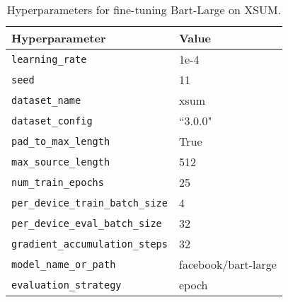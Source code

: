 \begin{table}[ht!]
\centering
\begin{tabular}{ll}
\toprule
\textbf{Hyperparameter} & \textbf{Value} \\
\midrule
\texttt{learning\_rate} & 1e-4 \\
\texttt{seed} & 11 \\
\texttt{dataset\_name} & xsum \\
\texttt{dataset\_config} & ``3.0.0" \\
\texttt{pad\_to\_max\_length} & True \\
\texttt{max\_source\_length} & 512 \\
\texttt{num\_train\_epochs} & 25 \\
\texttt{per\_device\_train\_batch\_size} & 4 \\
\texttt{per\_device\_eval\_batch\_size} & 32 \\
\texttt{gradient\_accumulation\_steps} & 32 \\
\texttt{model\_name\_or\_path} & facebook/bart-large \\
\texttt{evaluation\_strategy} & epoch \\
\bottomrule
\end{tabular}
\caption{Hyperparameters for fine-tuning Bart-Large on XSUM.}
\label{tab:xsum_hparams}
\end{table}



